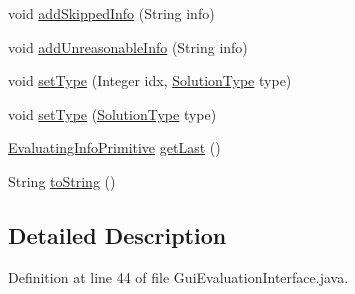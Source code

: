 \begin{DoxyCompactItemize}
\item 
void \hyperlink{classit_1_1emarolab_1_1cagg_1_1core_1_1evaluation_1_1interfacing_1_1GuiEvaluationInterface_1_1EvaluatingInfo_ac2c48e376aeafdcce68ab13705436361}{add\-Skipped\-Info} (String info)
\item 
void \hyperlink{classit_1_1emarolab_1_1cagg_1_1core_1_1evaluation_1_1interfacing_1_1GuiEvaluationInterface_1_1EvaluatingInfo_a5422cb937a05ed9300f458f361cfcb44}{add\-Unreasonable\-Info} (String info)
\item 
void \hyperlink{classit_1_1emarolab_1_1cagg_1_1core_1_1evaluation_1_1interfacing_1_1GuiEvaluationInterface_1_1EvaluatingInfo_a0e2b14b4fde47b4117d4973f04785a3d}{set\-Type} (Integer idx, \hyperlink{enumit_1_1emarolab_1_1cagg_1_1core_1_1evaluation_1_1interfacing_1_1GuiEvaluationInterface_1_1SolutionType}{Solution\-Type} type)
\item 
void \hyperlink{classit_1_1emarolab_1_1cagg_1_1core_1_1evaluation_1_1interfacing_1_1GuiEvaluationInterface_1_1EvaluatingInfo_a8275061e80001da180012c3a1bbc3a90}{set\-Type} (\hyperlink{enumit_1_1emarolab_1_1cagg_1_1core_1_1evaluation_1_1interfacing_1_1GuiEvaluationInterface_1_1SolutionType}{Solution\-Type} type)
\item 
\hyperlink{classit_1_1emarolab_1_1cagg_1_1core_1_1evaluation_1_1interfacing_1_1GuiEvaluationInterface_1_1EvaluatingInfoPrimitive}{Evaluating\-Info\-Primitive} \hyperlink{classit_1_1emarolab_1_1cagg_1_1core_1_1evaluation_1_1interfacing_1_1GuiEvaluationInterface_1_1EvaluatingInfo_a8bb7b9bda32f510819142bb14cf5a481}{get\-Last} ()
\item 
String \hyperlink{classit_1_1emarolab_1_1cagg_1_1core_1_1evaluation_1_1interfacing_1_1GuiEvaluationInterface_1_1EvaluatingInfo_afd2b62eb5ff287813e48b4b54aacc8f5}{to\-String} ()
\end{DoxyCompactItemize}


\subsection{Detailed Description}


Definition at line 44 of file Gui\-Evaluation\-Interface.\-java.



